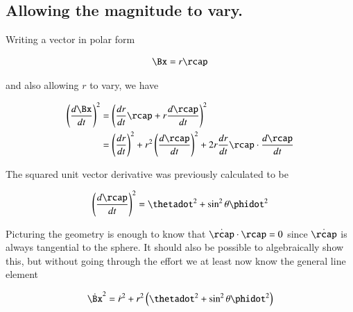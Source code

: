 \subsection{Allowing the magnitude to vary.}

Writing a vector in polar form

\begin{align}\label{eqn:sphericalPolarUnit:xoo1}
\Bx = r \rcap
\end{align}

and also allowing $r$ to vary, we have

\begin{align*}
\left(\frac{d\Bx}{dt}\right)^2 
&= \left( \frac{dr}{dt} \rcap + r \frac{d\rcap}{dt} \right)^2 \\
&= 
\left( \frac{dr}{dt} \right)^2 + r^2 \left( \frac{d\rcap}{dt} \right)^2 
+ 2 r \frac{dr}{dt} \rcap \cdot \frac{d\rcap}{dt} 
\end{align*}

The squared unit vector derivative was previously calculated to be

\begin{align}\label{eqn:sphericalPolarUnit:xoo2}
\left(\frac{d \rcap}{dt}\right)^2 = \thetadot^2 + \sin^2\theta \phidot^2 
\end{align}

Picturing the geometry is enough to know that $\dot{\rcap} \cdot \rcap = 0$ since $\dot{\rcap}$ is always tangential to the sphere.  It should also be possible to algebraically show this, but without going through the effort we at least now know the general line element

\begin{align}\label{eqn:sphericalPolarUnit:xoo3}
\dot{\Bx}^2 = {\dot{r}}^2 + r^2 \left( \thetadot^2 + \sin^2\theta \phidot^2 \right)
\end{align}

%
%
%
%

\EndArticle
